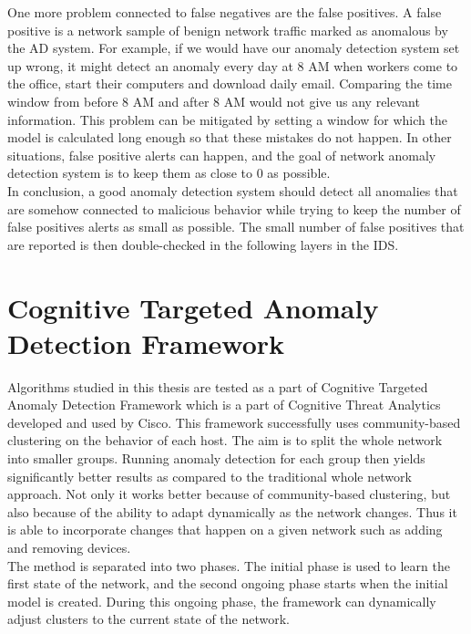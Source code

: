 \documentclass[thesis=B,english]{FITthesis}[2012/10/20]
\begin{document}
One more problem connected to false negatives are the false positives.
A false positive is a network sample of benign network traffic marked as anomalous by the AD system.
For example, if we would have our anomaly detection system set up wrong, it might detect an anomaly every day at 8 AM when workers come to the office, start their computers and download daily email.
Comparing the time window from before 8 AM and after 8 AM would not give us any relevant information.
This problem can be mitigated by setting a window for which the model is calculated long enough so that these mistakes do not happen.
In other situations, false positive alerts can happen, and the goal of network anomaly detection system is to keep them as close to 0 as possible. \\

In conclusion, a good anomaly detection system should detect all anomalies that are somehow connected to malicious behavior while trying to keep the number of false positives alerts as small as possible.
The small number of false positives that are reported is then double-checked in the following layers in the IDS.

\section{Cognitive Targeted Anomaly Detection Framework}\label{sec:ctadf}

Algorithms studied in this thesis are tested as a part of Cognitive Targeted Anomaly Detection Framework which is a part of Cognitive Threat Analytics developed and used by Cisco.
This framework successfully uses community-based clustering on the behavior of each host.
The aim is to split the whole network into smaller groups.
Running anomaly detection for each group then yields significantly better results as compared to the traditional whole network approach.
Not only it works better because of community-based clustering, but also because of the ability to adapt dynamically as the network changes.
Thus it is able to incorporate changes that happen on a given network such as adding and removing devices.\\

The method is separated into two phases.
The initial phase is used to learn the first state of the network, and the second ongoing phase starts when the initial model is created.
During this ongoing phase, the framework can dynamically adjust clusters to the current state of the network. \\
\end{document}

